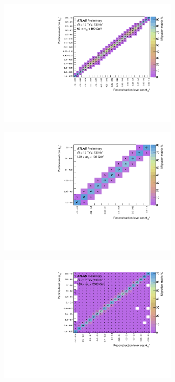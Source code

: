 \begin{figure}[htb]
  \centering
  \begin{subfigure}{.49\textwidth}\centering\includegraphics[width = 0.95\textwidth]{Figures/m4l/UnfoldingStudies/v014_matrices/cosThetaStar1_m4l60-100Matrix.pdf}\end{subfigure}
  \begin{subfigure}{.49\textwidth}\centering\includegraphics[width = 0.95\textwidth]{Figures/m4l/UnfoldingStudies/v014_matrices/cosThetaStar1_m4l120-130Matrix.pdf}\end{subfigure}
  \begin{subfigure}{.49\textwidth}\centering\includegraphics[width = 0.95\textwidth]{Figures/m4l/UnfoldingStudies/v014_matrices/cosThetaStar1_m4l180-2000Matrix.pdf}\end{subfigure}

\end{figure}
